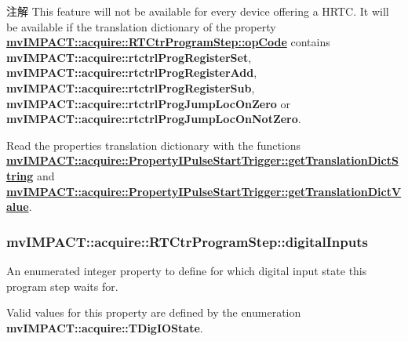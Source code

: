 \begin{DoxyNote}{注解}
This feature will not be available for every device offering a H\+R\+T\+C. It will be available if the translation dictionary of the property {\bfseries \hyperlink{classmv_i_m_p_a_c_t_1_1acquire_1_1_r_t_ctr_program_step_a823c9cad26ad628155d68130ad1d6d5d}{mv\+I\+M\+P\+A\+C\+T\+::acquire\+::\+R\+T\+Ctr\+Program\+Step\+::op\+Code}} contains {\bfseries mv\+I\+M\+P\+A\+C\+T\+::acquire\+::rtctrl\+Prog\+Register\+Set}, {\bfseries mv\+I\+M\+P\+A\+C\+T\+::acquire\+::rtctrl\+Prog\+Register\+Add}, {\bfseries mv\+I\+M\+P\+A\+C\+T\+::acquire\+::rtctrl\+Prog\+Register\+Sub}, {\bfseries mv\+I\+M\+P\+A\+C\+T\+::acquire\+::rtctrl\+Prog\+Jump\+Loc\+On\+Zero} or {\bfseries mv\+I\+M\+P\+A\+C\+T\+::acquire\+::rtctrl\+Prog\+Jump\+Loc\+On\+Not\+Zero}.
\end{DoxyNote}
Read the properties translation dictionary with the functions {\bfseries \hyperlink{classmv_i_m_p_a_c_t_1_1acquire_1_1_enum_property_i_af5ec5a9c3657af2917f4ead78ef067db}{mv\+I\+M\+P\+A\+C\+T\+::acquire\+::\+Property\+I\+Pulse\+Start\+Trigger\+::get\+Translation\+Dict\+String}} and {\bfseries \hyperlink{classmv_i_m_p_a_c_t_1_1acquire_1_1_enum_property_i_a0c50700ebff2806621c63d03b624f200}{mv\+I\+M\+P\+A\+C\+T\+::acquire\+::\+Property\+I\+Pulse\+Start\+Trigger\+::get\+Translation\+Dict\+Value}}. \hypertarget{classmv_i_m_p_a_c_t_1_1acquire_1_1_r_t_ctr_program_step_a15975e93c4803355e9ce1bf5a33786ec}{
\subsubsection[{digital\+Inputs}]{ mv\+I\+M\+P\+A\+C\+T\+::acquire\+::\+R\+T\+Ctr\+Program\+Step\+::digital\+Inputs}}\label{classmv_i_m_p_a_c_t_1_1acquire_1_1_r_t_ctr_program_step_a15975e93c4803355e9ce1bf5a33786ec}


An enumerated integer property to define for which digital input state this program step waits for. 

Valid values for this property are defined by the enumeration {\bfseries mv\+I\+M\+P\+A\+C\+T\+::acquire\+::\+T\+Dig\+I\+O\+State}.

